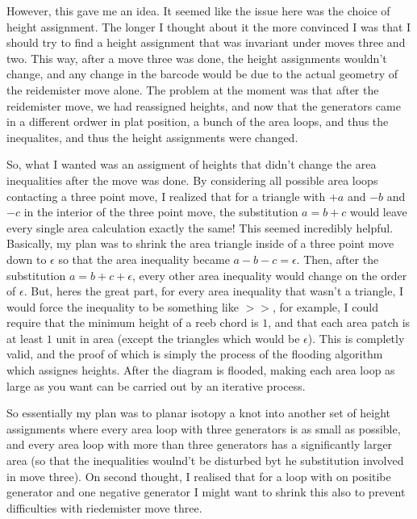 \documentclass[11pt,oneside]{amsart}
\begin{document}
However, this gave me an idea. It seemed like the issue here was the choice of height assignment. The longer I thought about it the more convinced I was that I should try to find a height assignment that was invariant under moves three and two. This way, after a move three was done, the height assignments wouldn't change, and any change in the barcode would be due to the actual geometry of the reidemister move alone. The problem at the moment was that after the reidemister move, we had reassigned heights, and now that the generators came in a different ordwer in plat position, a bunch of the area loops, and thus the inequalites, and thus the height assignments were changed. 

So, what I wanted was an assigment of heights that didn't change the area inequalities after the move was done. By considering all possible area loops contacting a three point move, I realized that for a triangle with $+a$ and $-b$ and $-c$ in the interior of the three point move, the substitution $a = b+c$ would leave every single area calculation exactly the same! This seemed incredibly helpful. Basically, my plan was to shrink the area triangle inside of a three point move down to $\epsilon$ so that the area inequality became $a - b - c= \epsilon$. Then, after the substitution $a = b + c + \epsilon$, every other area inequality would change on the order of $\epsilon$. But, heres the great part, for every area inequality that wasn't a triangle, I would force the inequality to be something like $>>$, for example, I could require that the minimum height of a reeb chord is $1$, and that each area patch is at least $1$ unit in area (except the triangles which would be $\epsilon$). This is completly valid, and the proof of which is simply the process of the flooding algorithm which assignes heights. After the diagram is flooded, making each area loop as large as you want can be carried out by an iterative process. 


So essentially my plan was to planar isotopy a knot into another set of height assignments where every area loop with three generators is as small as possible, and every area loop with more than three generators has a significantly larger area (so that the inequalities woulnd't be disturbed byt he substitution involved in move three). On second thought, I realised that for a loop with on positibe generator and one negative generator I might want to shrink this also to prevent difficulties with riedemister move three.
\end{document}
